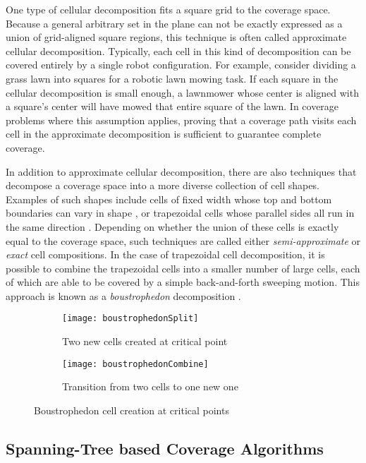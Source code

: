 One type of cellular decomposition fits a square grid to the coverage space. Because a general arbitrary set in the plane can not be exactly expressed as a union of grid-aligned square regions, this technique is often called approximate cellular decomposition. Typically, each cell in this kind of decomposition can be covered entirely by a single robot configuration. For example, consider dividing a grass lawn into squares for a robotic lawn mowing task. If each square in the cellular decomposition is small enough, a lawnmower whose center is aligned with a square's center will have mowed that entire square of the lawn. In coverage problems where this assumption applies, proving that a coverage path visits each cell in the approximate decomposition is sufficient to guarantee complete coverage.

In addition to approximate cellular decomposition, there are also techniques that decompose a coverage space into a more diverse collection of cell shapes. Examples of such shapes include cells of fixed width whose top and bottom boundaries can vary in shape \cite{Hert1996}, or trapezoidal cells whose parallel sides all run in the same direction \cite{Choset-2000}. Depending on whether the union of these cells is exactly equal to the coverage space, such techniques are called either \textit{semi-approximate} or \textit{exact} cell compositions. In the case of trapezoidal cell decomposition, it is possible to combine the trapezoidal cells into a smaller number of large cells, each of which are able to be covered by a simple back-and-forth sweeping motion. This approach is known as a \textit{boustrophedon} decomposition \cite{Choset-2000}.

\begin{figure}[H]
\begin{subfigure}{.5\textwidth}
  \centering
  \texttt{[image: boustrophedonSplit]}
  \caption{Two new cells created at critical point}
\end{subfigure}
\begin{subfigure}{.5\textwidth}
  \centering
  \texttt{[image: boustrophedonCombine]}
  \caption{Transition from two cells to one new one}
\end{subfigure}
\caption[Boustrophedon Decomposition]{Boustrophedon cell creation at critical points}
\end{figure}

\subsection{Spanning-Tree based Coverage Algorithms}

